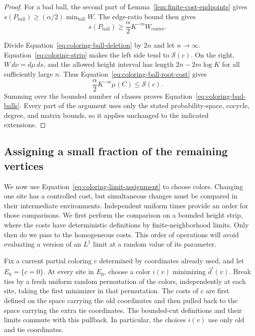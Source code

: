 \begin{proof}
For a bad ball, the second part of Lemma~\ref{lem:finite-cost-endpoints}
gives $s(P_{\mathrm{ball}})\geq(\alpha/2)\min_{\mathrm{ball}}W$.
The edge-ratio bound then gives
\begin{equation}
 s(P_{\mathrm{ball}})
    \geq\frac\alpha2 K^{-m}W_{\mathrm{center}}.
 \label{eq:coloring-ball-root-cost}
\end{equation}

Divide Equation~\eqref{eq:coloring-ball-deletion} by $2n$ and let
$n\to\infty$.  Equation~\eqref{eq:coloring-strip} makes the left side
tend to $\mathcal S(c)$.  On the right,
$W\,d\nu=d\mu\,ds$, and the allowed height interval has length
$2n-2m\log K$ for all sufficiently large $n$.  Thus
Equation~\eqref{eq:coloring-ball-root-cost} gives
\[
 \frac\alpha2 K^{-m}\mu(C)\leq\mathcal S(c).
\]
Summing over the bounded number of classes proves
Equation~\eqref{eq:coloring-bad-balls}.  Every part of the argument uses
only the stated probability-space, cocycle, degree, and matrix bounds,
so it applies unchanged to the indicated extensions.
\end{proof}

\subsection{Assigning a small fraction of the remaining vertices}

We now use Equation~\eqref{eq:coloring-limit-assignment} to choose colors.
Changing one site has a controlled cost, but simultaneous changes must be
compared in their intermediate environments.  Independent uniform times
provide an order for those comparisons.  We first perform the comparison
on a bounded height strip, where the costs have deterministic definitions
by finite-neighborhood limits.  Only then do we pass to the homogeneous
costs.  This order of operations will avoid evaluating a version of an
$L^1$ limit at a random value of its parameter.

Fix a current partial coloring $c$ determined by coordinates already used,
and let $E_0=\{c=0\}$.  At every site in $E_0$, choose a color $i(v)$
minimizing $\bar d^{i}(v)$.  Break ties by a fresh uniform random
permutation of the colors, independently at each site, taking the first
minimizer in that permutation.  The costs of $c$ are first defined on the
space carrying the old coordinates and then pulled back to the space
carrying the extra tie coordinates.  The bounded-cut definitions and
their limits commute with this pullback.  In particular, the choices
$i(v)$ use only old and tie coordinates.

